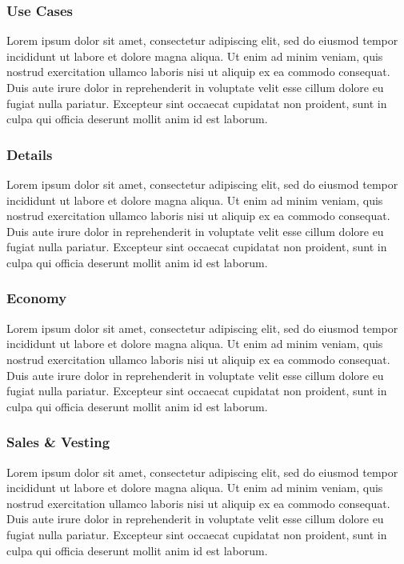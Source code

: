 \documentclass{article}
\newcommand\tab[1][1cm]{\hspace*{#1}}
\begin{document}
\subsubsection{Use Cases}

\tab Lorem ipsum dolor sit amet, consectetur adipiscing elit, sed do eiusmod tempor incididunt ut labore et dolore magna aliqua. Ut enim ad minim veniam, quis nostrud exercitation ullamco laboris nisi ut aliquip ex ea commodo consequat. Duis aute irure dolor in reprehenderit in voluptate velit esse cillum dolore eu fugiat nulla pariatur. Excepteur sint occaecat cupidatat non proident, sunt in culpa qui officia deserunt mollit anim id est laborum.

\subsubsection{Details}

\tab Lorem ipsum dolor sit amet, consectetur adipiscing elit, sed do eiusmod tempor incididunt ut labore et dolore magna aliqua. Ut enim ad minim veniam, quis nostrud exercitation ullamco laboris nisi ut aliquip ex ea commodo consequat. Duis aute irure dolor in reprehenderit in voluptate velit esse cillum dolore eu fugiat nulla pariatur. Excepteur sint occaecat cupidatat non proident, sunt in culpa qui officia deserunt mollit anim id est laborum.

\subsubsection{Economy}

\tab Lorem ipsum dolor sit amet, consectetur adipiscing elit, sed do eiusmod tempor incididunt ut labore et dolore magna aliqua. Ut enim ad minim veniam, quis nostrud exercitation ullamco laboris nisi ut aliquip ex ea commodo consequat. Duis aute irure dolor in reprehenderit in voluptate velit esse cillum dolore eu fugiat nulla pariatur. Excepteur sint occaecat cupidatat non proident, sunt in culpa qui officia deserunt mollit anim id est laborum.

\subsubsection{Sales \& Vesting}

\tab Lorem ipsum dolor sit amet, consectetur adipiscing elit, sed do eiusmod tempor incididunt ut labore et dolore magna aliqua. Ut enim ad minim veniam, quis nostrud exercitation ullamco laboris nisi ut aliquip ex ea commodo consequat. Duis aute irure dolor in reprehenderit in voluptate velit esse cillum dolore eu fugiat nulla pariatur. Excepteur sint occaecat cupidatat non proident, sunt in culpa qui officia deserunt mollit anim id est laborum.
\end{document}
